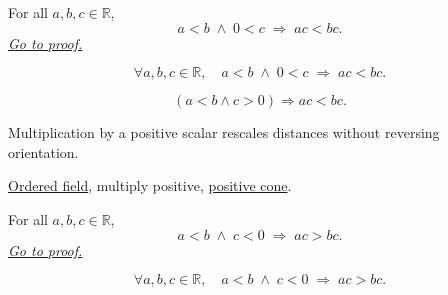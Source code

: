 
\begin{theorem}
\label{thm:ineq-multiply-positive}
For all $a, b, c \in \mathbb{R}$,
\[
  a < b \;\land\; 0 < c \;\Rightarrow\; ac < bc.
\]
\hyperref[prf:ineq-multiply-positive]{\textit{Go to proof.}}
\end{theorem}



\begin{remark*}
\[
  \forall a, b, c \in \mathbb{R},\quad
  a < b \;\land\; 0 < c \;\Rightarrow\; ac < bc.
\]
\end{remark*}

\begin{remark*}
\[
(a<b\land c>0)\Rightarrow ac<bc.
\]
\end{remark*}

\begin{remark*}[Interpretation]
Multiplication by a positive scalar rescales distances without reversing orientation.
\end{remark*}

\begin{dependencies}
\hyperref[def:real-ordered-field]{Ordered field},
multiply positive,
\hyperref[def:positive-cone]{positive cone}.
\end{dependencies}


\begin{theorem}
\label{thm:ineq-multiply-negative}
For all $a, b, c \in \mathbb{R}$,
\[
  a < b \;\land\; c < 0 \;\Rightarrow\; ac > bc.
\]
\hyperref[prf:ineq-multiply-negative]{\textit{Go to proof.}}
\end{theorem}



\begin{remark*}
\[
  \forall a, b, c \in \mathbb{R},\quad
  a < b \;\land\; c < 0 \;\Rightarrow\; ac > bc.
\]
\end{remark*}

